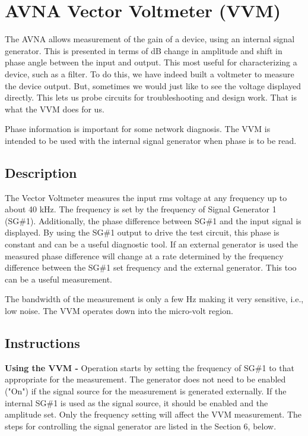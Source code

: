 \section{AVNA Vector Voltmeter  (VVM)}
\label{sect:VVM}
The AVNA allows measurement of the gain of a device, using an internal signal generator.  This is presented in terms of dB change in amplitude and shift in phase angle between the input and output.  This most useful for characterizing a device, such as a filter.  To do this, we have indeed built a voltmeter to measure the device output.  But, sometimes we would just like to see the voltage displayed directly.  This lets us probe circuits for troubleshooting  and design work.   That is what the VVM does for us.

Phase information is important for some network diagnosis.  The VVM is intended to be used with the internal signal generator when phase is to be read.

\subsection{Description}
\label{subsect:VVMDescr}
The Vector Voltmeter measures the input rms voltage at any frequency up to about 40 kHz.  The frequency is set by the frequency of Signal Generator 1 (SG\#1).  Additionally, the phase difference between SG\#1 and the input signal is displayed.  By using the SG\#1 output to drive the test circuit, this phase is constant and can be a useful diagnostic tool.   If an external generator is used the measured phase difference will change at a rate determined by the frequency difference between the SG\#1 set frequency and the external generator.    This too can be a useful measurement.  

The bandwidth of the measurement is only a few Hz making it very sensitive, i.e., low noise.  The VVM operates down into the micro-volt  region.

\subsection{Instructions}
\label{subsect:VVMInstr}
\textbf{Using the VVM - }Operation starts  by setting the frequency of SG\#1 to that appropriate for the measurement.  The generator does not need to be enabled ("On") if the signal source for the measurement is generated externally.  If the internal SG\#1 is used as the signal source, it should be enabled and the amplitude set.   Only the frequency setting will affect the VVM measurement.  The steps for controlling the signal generator are listed in the Section 6, below.

